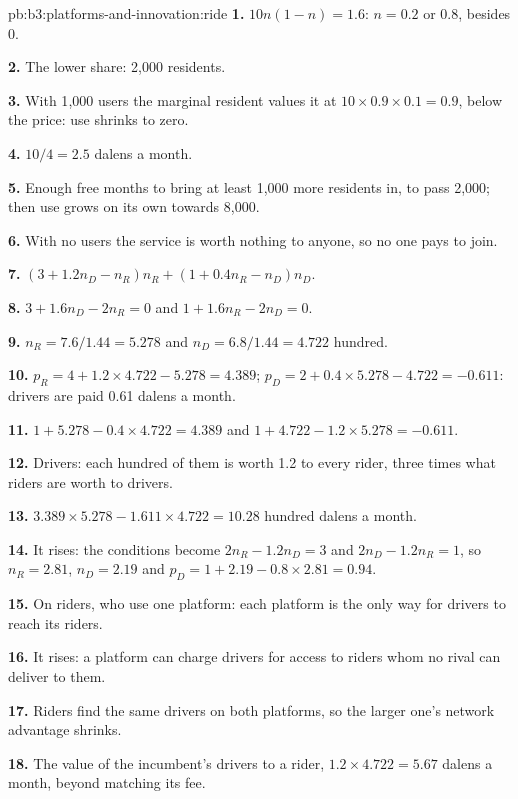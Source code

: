 \begin{solution}{pb:b3:platforms-and-innovation:ride}
\textbf{1.} $10n(1 - n) = 1.6$: $n = 0.2$ or 0.8, besides 0.

\textbf{2.} The lower share: 2{,}000 residents.

\textbf{3.} With 1{,}000 users the marginal resident values it at $10 \times 0.9 \times 0.1 = 0.9$, below the price: use shrinks to
zero.

\textbf{4.} $10/4 = 2.5$ dalens a month.

\textbf{5.} Enough free months to bring at least 1{,}000 more residents in, to pass 2{,}000; then use
grows on its own towards 8{,}000.

\textbf{6.} With no users the service is worth nothing to anyone, so no one pays to join.

\textbf{7.} $(3 + 1.2n_D - n_R)n_R + (1 + 0.4n_R - n_D)n_D$.

\textbf{8.} $3 + 1.6n_D - 2n_R = 0$ and $1 + 1.6n_R - 2n_D = 0$.

\textbf{9.} $n_R = 7.6/1.44 = 5.278$ and $n_D = 6.8/1.44 = 4.722$ hundred.

\textbf{10.} $p_R = 4 + 1.2 \times 4.722 - 5.278 = 4.389$; $p_D = 2 + 0.4 \times 5.278 - 4.722 = -0.611$: drivers are paid 0.61 dalens a month.

\textbf{11.} $1 + 5.278 - 0.4 \times 4.722 = 4.389$ and $1 + 4.722 - 1.2 \times 5.278 = -0.611$.

\textbf{12.} Drivers: each hundred of them is worth 1.2 to every rider, three times what riders are
worth to drivers.

\textbf{13.} $3.389 \times 5.278 - 1.611 \times 4.722 = 10.28$ hundred dalens a month.

\textbf{14.} It rises: the conditions become $2n_R - 1.2n_D = 3$ and $2n_D - 1.2n_R = 1$, so $n_R = 2.81$, $n_D = 2.19$ and $p_D = 1 + 2.19 - 0.8 \times 2.81 = 0.94$.

\textbf{15.} On riders, who use one platform: each platform is the only way for drivers to
reach its riders.

\textbf{16.} It rises: a platform can charge drivers for access to riders whom no rival can
deliver to them.

\textbf{17.} Riders find the same drivers on both platforms, so the larger one's network
advantage shrinks.

\textbf{18.} The value of the incumbent's drivers to a rider, $1.2 \times 4.722 = 5.67$ dalens a month, beyond matching its fee.


\end{solution}
